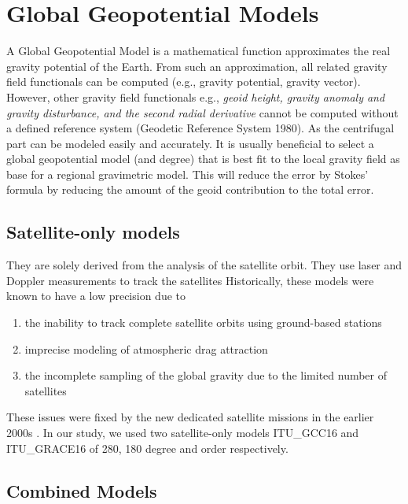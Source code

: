 \section{Global Geopotential Models}

A Global Geopotential Model is a mathematical function approximates the real gravity potential of the Earth. From such an approximation, all related gravity field functionals can be computed (e.g., gravity potential, gravity vector). However, other gravity field functionals e.g., \textit{geoid height, gravity anomaly and gravity disturbance, and the second radial derivative} cannot be computed without a defined reference system (Geodetic Reference System 1980). As the centrifugal part can be modeled easily and accurately. It is usually beneficial to select a global geopotential model (and degree) that is best fit to the local gravity field as base for a regional gravimetric model. This will reduce the error by Stokes' formula by reducing the amount of the geoid contribution to the total error.

\subsection{Satellite-only models} 
They are solely derived from the analysis of the satellite orbit. They use laser and Doppler measurements to track the satellites \cite{goce_sp123} Historically, these models were known to have a low precision due to

\begin{enumerate}
	\item the inability to track complete satellite orbits using ground-based stations
	\item imprecise modeling of atmospheric drag attraction
	\item the incomplete sampling of the global gravity due to the limited number of satellites
\end{enumerate}
 
 
 These issues were fixed by the new dedicated satellite missions in the earlier 2000s \cite{rummel}. In our study, we used two satellite-only models ITU\_GCC16 and ITU\_GRACE16 of 280, 180 degree and order respectively. 
 
 \subsection{Combined Models}
 
